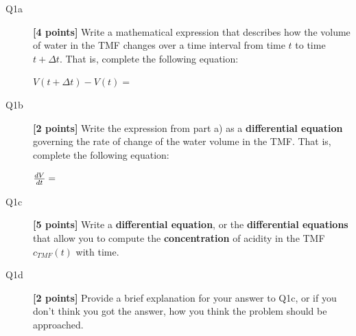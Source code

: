 \documentclass{article}
\begin{document}
\begin{description}
\item [Q1a] \textbf{[4 points]} Write a mathematical expression that describes how the volume of water in the TMF changes over a time interval from time $t$ to time $t+\Delta t$. That is, complete the following equation: 

$ V(t+\Delta t) - V(t) =$
\vspace{1.0cm}

\item [Q1b] \textbf{[2 points]}  Write the expression from part a) as a \textbf{differential equation} governing the rate of change of the water volume in the TMF. That is, complete the following equation:

${dV\over dt}=$
\vspace{1.5cm}

\item [Q1c] \textbf{[5 points]}   Write a \textbf{differential equation}, or the \textbf{differential equations} that allow you to compute the \textbf{concentration} of acidity in the TMF $c_{TMF}(t)$ with time. 
\vspace{2.5cm}
\item [Q1d] \textbf{[2 points]} Provide a brief explanation for your answer to Q1c, or if you don't think you got the answer, how you think the problem should be approached.
\vspace{1.5cm}



\end{description}
\end{document}
